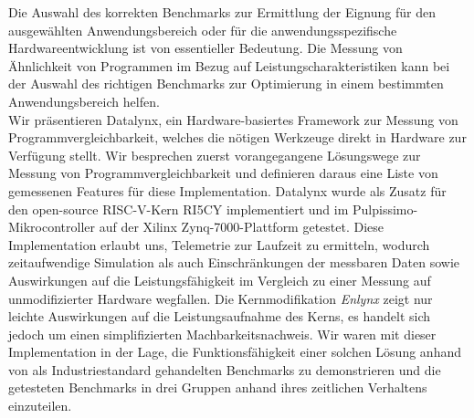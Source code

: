 Die Auswahl des korrekten Benchmarks zur Ermittlung der Eignung für den ausgewählten Anwendungsbereich oder für die anwendungsspezifische Hardwareentwicklung ist von essentieller Bedeutung. Die Messung von Ähnlichkeit von Programmen im Bezug auf Leistungscharakteristiken kann bei der Auswahl des richtigen Benchmarks zur Optimierung in einem bestimmten Anwendungsbereich helfen. \\
Wir präsentieren Datalynx, ein Hardware-basiertes Framework zur Messung von Programmvergleichbarkeit, welches die nötigen Werkzeuge direkt in Hardware zur Verfügung stellt. Wir besprechen zuerst vorangegangene Lösungswege zur Messung von Programmvergleichbarkeit und definieren daraus eine Liste von gemessenen Features für diese Implementation. Datalynx wurde als Zusatz für den open-source RISC-V-Kern RI5CY implementiert und im Pulpissimo-Mikrocontroller auf der Xilinx Zynq-7000-Plattform getestet. Diese Implementation erlaubt uns, Telemetrie zur Laufzeit zu ermitteln, wodurch zeitaufwendige Simulation als auch Einschränkungen der messbaren Daten sowie Auswirkungen auf die Leistungsfähigkeit im Vergleich zu einer Messung auf unmodifizierter Hardware wegfallen. Die Kernmodifikation \emph{Enlynx} zeigt nur leichte Auswirkungen auf die Leistungsaufnahme des Kerns, es handelt sich jedoch um einen simplifizierten Machbarkeitsnachweis. Wir waren mit dieser Implementation in der Lage, die Funktionsfähigkeit einer solchen Lösung anhand von als Industriestandard gehandelten Benchmarks zu demonstrieren und die getesteten Benchmarks in drei Gruppen anhand ihres zeitlichen Verhaltens einzuteilen.